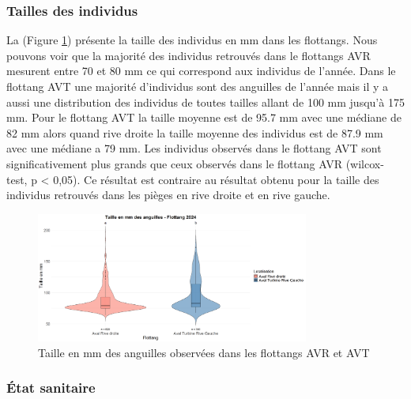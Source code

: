 \documentclass[11pt,titlepage,twoside]{article}\usepackage[]{graphicx}\usepackage[table]{xcolor}
\begin{document}
\subsubsection{Tailles des individus}

La (Figure \ref{taille_flottang_oral}) présente la taille des individus en mm dans les flottangs. Nous pouvons voir que la majorité des individus retrouvés dans le flottangs AVR mesurent entre 70 et 80 mm ce qui correspond aux individus de l’année. Dans le flottang AVT une majorité d’individus sont des anguilles de l’année mais il y a aussi une distribution des individus de toutes tailles allant de 100 mm jusqu’à 175 mm. Pour le flottang AVT la taille moyenne est de 95.7 mm avec une médiane de 82 mm alors quand rive droite la taille moyenne des individus est de 87.9 mm avec une médiane a 79 mm. Les individus observés dans le flottang AVT sont significativement plus grands que ceux observés dans le flottang AVR (wilcox-test, p < 0,05). Ce résultat est contraire au résultat obtenu pour la taille des individus retrouvés dans les pièges en rive droite et en rive gauche.

\begin{figure}[htpb]
\centering
\includegraphics[width=0.8\textwidth]{taille_flottang_oral.png}
\caption{Taille en mm des anguilles observées dans les flottangs AVR et AVT}
\label{taille_flottang_oral}
\end{figure} 

\subsubsection{État sanitaire }
\end{document}
